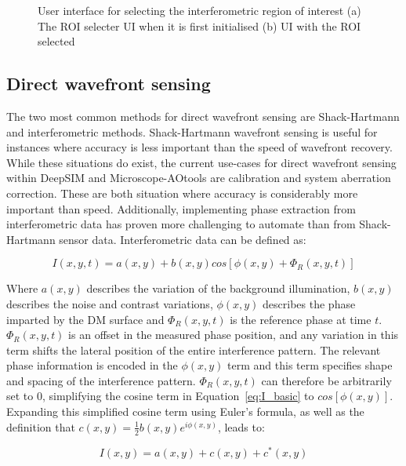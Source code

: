 \begin{figure}[h]
\begin{subfigure}{0.4\textwidth}
		\caption{}
		\label{fig:ROI_selector}
	\end{subfigure}
	\caption{User interface for selecting the interferometric region of interest (a) The ROI selecter UI when it is first initialised (b) UI with the ROI selected}
	\label{fig:ROI_selectors}
\end{figure}

\subsection{Direct wavefront sensing}
\label{subsec:direct_wavefront_sensing}

The two most common methods for direct wavefront sensing are Shack-Hartmann and interferometric methods. Shack-Hartmann wavefront sensing is useful for instances where accuracy is less important than the speed of wavefront recovery. While these situations do exist, the current use-cases for direct wavefront sensing within DeepSIM and Microscope-AOtools are calibration and system aberration correction. These are both situation where accuracy is considerably more important than speed. Additionally, implementing phase extraction from interferometric data has proven more challenging  to automate than from Shack-Hartmann sensor data. Interferometric data can be defined as:

\begin{equation}\label{eq:I_basic}
I(x,y,t) = a(x,y) + b(x,y)cos[\phi(x,y) + \Phi_{R}(x,y,t)]
\end{equation}

Where $a(x,y)$ describes the variation of the background illumination, $b(x,y)$ describes the noise and contrast variations, $\phi(x,y)$ describes the phase imparted by the DM surface and $\Phi_{R}(x,y,t)$ is the reference phase at time $t$. $\Phi_{R}(x,y,t)$ is an offset in the measured phase position, and any variation in this term shifts the lateral position of the entire interference pattern. The relevant phase information is encoded in the $\phi(x,y)$ term and this term specifies shape and spacing of the interference pattern. $\Phi_{R}(x,y,t)$ can therefore be arbitrarily set to 0, simplifying the cosine term in Equation~\ref{eq:I_basic} to $cos[\phi(x,y)]$. Expanding this simplified cosine term using Euler's formula, as well as the definition that $c(x,y) = \frac{1}{2}b(x,y)e^{i\phi(x,y)}$, leads to:

\begin{equation}\label{eq:I_cos_expand}
I(x,y) = a(x,y) + c(x,y) + c^{*}(x,y)
\end{equation}

